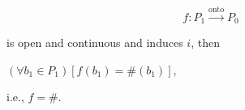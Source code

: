$$f: P_1 \xrightarrow{\text{onto}} P_0$$

is open and continuous and induces $i$, then

$(\forall b_1 \in P_1)[f(b_1) = \#(b_1)]$,

i.e., $f = \#$.
